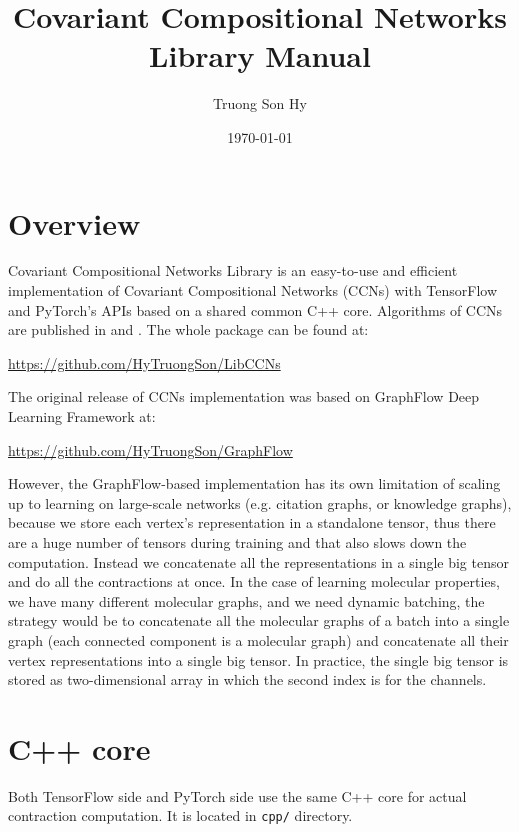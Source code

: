 \documentclass[12pt]{article}
\title{Covariant Compositional Networks Library Manual}
\author{Truong Son Hy}
\date{\today}
\begin{document}
\maketitle{}

\tableofcontents

\clearpage

\section{Overview}

Covariant Compositional Networks Library is an easy-to-use and efficient implementation of Covariant Compositional Networks (CCNs) with TensorFlow and PyTorch's APIs based on a shared common C++ core. Algorithms of CCNs are published in \cite{CompNetsArxiv18} and \cite{doi:10.1063/1.5024797}. The whole package can be found at:
\begin{center}
\url{https://github.com/HyTruongSon/LibCCNs}
\end{center}
The original release of CCNs implementation was based on GraphFlow Deep Learning Framework at:
\begin{center}
\url{https://github.com/HyTruongSon/GraphFlow}
\end{center}
However, the GraphFlow-based implementation has its own limitation of scaling up to learning on large-scale networks (e.g. citation graphs, or knowledge graphs), because we store each vertex's representation in a standalone tensor, thus there are a huge number of tensors during training and that also slows down the computation. Instead we concatenate all the representations in a single big tensor and do all the contractions at once. In the case of learning molecular properties, we have many different molecular graphs, and we need dynamic batching, the strategy would be to concatenate all the molecular graphs of a batch into a single graph (each connected component is a molecular graph) and concatenate all their vertex representations into a single big tensor. In practice, the single big tensor is stored as two-dimensional array in which the second index is for the channels.

\clearpage

\section{C++ core}

Both TensorFlow side and PyTorch side use the same C++ core for actual contraction computation. It is located in \texttt{cpp/} directory.
\end{document}
